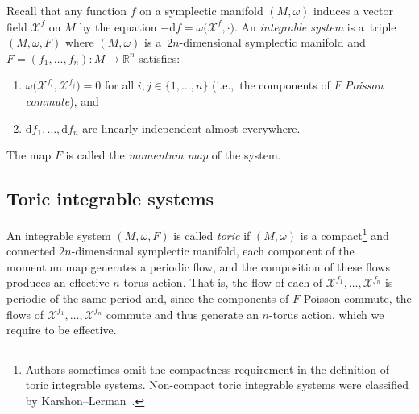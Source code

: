 \documentclass[pdftex]{sigma}
\numberwithin{equation}{section}
\def\R{{\mathbb R}}
\newcommand{\om}{\omega}
\begin{document}
Recall that any function $f$ on a symplectic manifold $(M,\om)$ induces a vector field $\mathcal{X}^f$ on $M$ by the equation $-\mathrm{d}f = \om\big(\mathcal{X}^f, \cdot\big)$.
An \emph{integrable system} is a~triple $(M,\om,F)$ where $(M,\om)$ is a~$2n$-dimensional symplectic manifold and $F=(f_1,\ldots, f_n)\colon M\to \R^n$ satisfies:
\begin{enumerate}\itemsep=0pt
 \item[(1)] $\om\big(\mathcal{X}^{f_i},\mathcal{X}^{f_j}\big)=0$ for all $i,j\in\{1,\ldots,n\}$ (i.e.,~the components of $F$ \emph{Poisson commute}), and
 \item[(2)] $\mathrm{d}f_1, \ldots, \mathrm{d}f_n$ are linearly independent almost everywhere.
\end{enumerate}
The map $F$ is called the \emph{momentum map} of the system.


\subsection{Toric integrable systems}
\label{sec:sympl-toric}
An integrable system $(M,\om,F)$ is called \emph{toric} if $(M,\om)$ is a compact\footnote{Authors sometimes omit the compactness requirement in the definition of toric integrable systems.
Non-compact toric integrable systems were classified by Karshon--Lerman~\cite{karshon-lerman}.} and connected $2n$-dimensional symplectic manifold, each component of the momentum map generates a periodic flow, and the composition of these flows produces an effective $n$-torus action.
That is, the flow of each of $\mathcal{X}^{f_1},\ldots,\mathcal{X}^{f_n}$ is periodic of the same period
and, since the components of $F$ Poisson commute, the flows of $\mathcal{X}^{f_1},\ldots,\mathcal{X}^{f_n}$ commute and thus generate an $n$-torus action, which we require to be effective.
\end{document}
